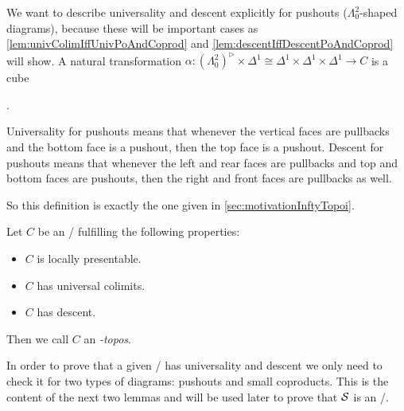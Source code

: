 \begin{remark}
    We want to describe universality and descent explicitly for pushouts ($\Lambda^2_0$-shaped diagrams), because these will be important cases as \cref{lem:univColimIffUnivPoAndCoprod} and \cref{lem:descentIffDescentPoAndCoprod} will show.
    A natural transformation $\alpha\colon\left(\Lambda_0^2\right)^{\rhd}\times\Delta^1\cong\Delta^1\times\Delta^1\times\Delta^1\to C$ is a cube
    \begin{center}
        \;.
    \end{center}
    Universality for pushouts means that whenever the vertical faces are pullbacks and the bottom face is a pushout, then the top face is a pushout.
    Descent for pushouts means that whenever the left and rear faces are pullbacks and top and bottom faces are pushouts, then the right and front faces are pullbacks as well.
    
    So this definition is exactly the one given in \cref{sec:motivationInftyTopoi}.
\end{remark}
\begin{definition}
    Let $C$ be an \inftycat/ fulfilling the following properties:
    \begin{itemize}
        \item $C$ is locally presentable.
        \item $C$ has universal colimits.
        \item $C$ has descent.
    \end{itemize}
    Then we call $C$ an \emph{\infty-topos}.
\end{definition}
In order to prove that a given \inftycat/ has universality and descent we only need to check it for two types of diagrams: pushouts and small coproducts.
This is the content of the next two lemmas and will be used later to prove that $\mathcal{S}$ is an \inftytop/.

